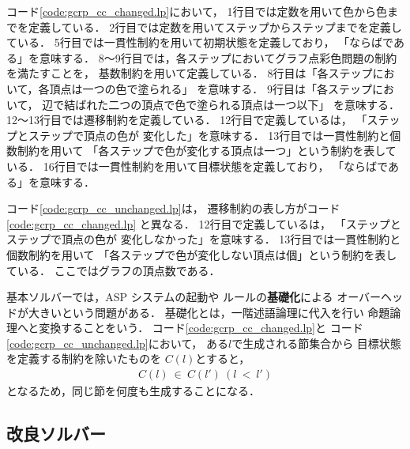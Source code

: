 コード\ref{code:gcrp_cc_changed.lp}において，
1行目では定数を用いて色から色までを定義している．
2行目では定数を用いてステップからステップまでを定義している．
5行目では一貫性制約を用いて初期状態を定義しており，
「ならばである」を意味する．
8～9行目では，各ステップにおいてグラフ点彩色問題の制約を満たすことを，
基数制約を用いて定義している．
8行目は「各ステップにおいて，各頂点は一つの色で塗られる」
を意味する．
9行目は「各ステップにおいて，
辺で結ばれた二つの頂点で色で塗られる頂点は一つ以下」
を意味する．
12～13行目では遷移制約を定義している．
12行目で定義しているは，
「ステップとステップで頂点の色が
変化した」を意味する．
13行目では一貫性制約と個数制約を用いて
「各ステップで色が変化する頂点は一つ」という制約を表している．
16行目では一貫性制約を用いて目標状態を定義しており，
「ならばである」を意味する．

コード\ref{code:gcrp_cc_unchanged.lp}は，
遷移制約の表し方がコード\ref{code:gcrp_cc_changed.lp}
と異なる．
12行目で定義しているは，
「ステップとステップで頂点の色が
変化しなかった」を意味する．
13行目では一貫性制約と個数制約を用いて
「各ステップで色が変化しない頂点は個」という制約を表している．
ここではグラフの頂点数である．

基本ソルバーでは，ASP システムの起動や
ルールの\textbf{基礎化}による
オーバーヘッドが大きいという問題がある．
基礎化とは，一階述語論理に代入を行い
命題論理へと変換することをいう．
コード\ref{code:gcrp_cc_changed.lp}と
コード\ref{code:gcrp_cc_unchanged.lp}において，
ある$l$で生成される節集合から
目標状態を定義する制約を除いたものを
$C(l)$とすると，
\begin{align}
  C(l) \: \in \: C(l') \: (l \: < \: l')
\end{align}
となるため，同じ節を何度も生成することになる．

\subsection{改良ソルバー}

